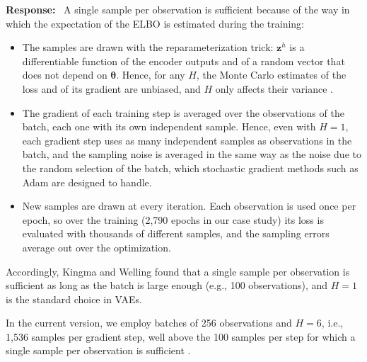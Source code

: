 \documentclass[11pt]{article}
\newenvironment{response}{\par\smallskip\noindent\color{resp}\textbf{Response:}\ }{\par}
\newcommand{\z}{\mathbf{z}}
\begin{document}
\begin{response}
A single sample per observation is sufficient because of the way in which the expectation of the ELBO is estimated during the training:
\begin{itemize}[leftmargin=*]
	\item The samples are drawn with the reparameterization trick: $\z^{h}$ is a differentiable function of the encoder outputs and of a random vector that does not depend on $\bm\theta$. Hence, for any $H$, the Monte Carlo estimates of the loss and of its gradient are unbiased, and $H$ only affects their variance \cite{kingma2014auto,mohamed2020monte}.
	\item The gradient of each training step is averaged over the observations of the batch, each one with its own independent sample. Hence, even with $H=1$, each gradient step uses as many independent samples as observations in the batch, and the sampling noise is averaged in the same way as the noise due to the random selection of the batch, which stochastic gradient methods such as Adam are designed to handle.
	\item New samples are drawn at every iteration. Each observation is used once per epoch, so over the training (2,790 epochs in our case study) its loss is evaluated with thousands of different samples, and the sampling errors average out over the optimization.
\end{itemize}
Accordingly, Kingma and Welling \cite{kingma2014auto} found that a single sample per observation is sufficient as long as the batch is large enough (e.g., 100 observations), and $H=1$ is the standard choice in VAEs.

In the current version, we employ batches of 256 observations and $H=6$, i.e., 1,536 samples per gradient step, well above the 100 samples per step for which a single sample per observation is sufficient \cite{kingma2014auto}.


\end{response}
\end{document}
